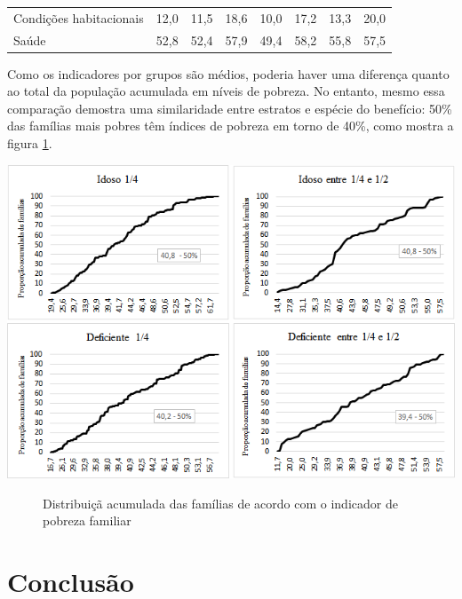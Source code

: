 \documentclass[
	12pt,				%
	openright,			%
	twoside,			%
	a4paper,			%
	english,			%
	french,				%
	spanish,			%
	brazil				%
	]{abntex2}
\begin{document}
\begin{table}[H]
\begin{tabular}{@{}m{5cm}lllllll@{}}
		Condições habitacionais   & 12,0                   & 11,5    & 18,6                                                       & 10,0    & 17,2                                          & 13,3    & 20,0                                                       \\
		Saúde                     & 52,8                   & 52,4    & 57,9                                                       & 49,4    & 58,2                                          & 55,8    & 57,5                                                       \\ \bottomrule
	\end{tabular}
\end{table}

Como os indicadores por grupos são médios, poderia haver uma diferença quanto ao total da população acumulada em níveis de pobreza. No entanto, mesmo essa comparação demostra uma similaridade entre estratos e espécie do benefício: 50\% das famílias mais pobres têm índices de pobreza em torno de 40\%, como mostra a figura \ref{ind_ac_figura}.

\begin{center}
	\includegraphics[scale=0.93]{prop_ac_indicegeral_especie.png}
	\begin{figure}[!h]
		\caption{Distribuiçã acumulada das famílias de acordo com o indicador de pobreza familiar}
		\label{ind_ac_figura}
	\end{figure}
\end{center}

\chapter{Conclusão}
\end{document}
